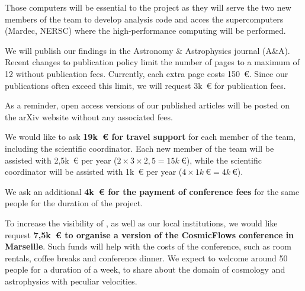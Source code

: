 Those computers will be essential to the project as they will serve 
the two new members of the team to develop analysis code and acces 
the supercomputers (Mardec, NERSC) where the high-performance computing 
will be performed. 





We will publish our findings in the Astronomy \& Astrophysics  journal (A\&A).
Recent changes to publication policy limit the number of pages to a maximum of 12
without publication fees. Currently, each extra page costs 150~€. Since our 
publications often exceed this limit, we will request 3k~€ for publication fees. 

As a reminder, open access versions of our published articles will be posted on
the arXiv website without any associated fees. 




We would like to ask \textbf{19k~€ for travel support} for each member 
of the team, including the scientific coordinator. 
Each new member of the team will be assisted with 2,5k~€ per year ($2\times 3 \times 2,5 = 15k~€$), 
while the scientific coordinator will be assisted with 1k~€ per year ($4 \times 1k~€ = 4k~€$). 

We ask an additional \textbf{4k~€ for the payment of conference fees} for the same people
for the duration of the project. 

To increase the visibility of \projacro, as well as our local institutions, 
we would like request \textbf{7,5k~€ to organise a version of the CosmicFlows conference in Marseille}. 
Such funds will help with the costs of the conference, such as room rentals, 
coffee breaks and conference dinner. We expect to welcome around 50 people 
for a duration of a week, to share about the domain of cosmology and astrophysics 
with peculiar velocities. 







